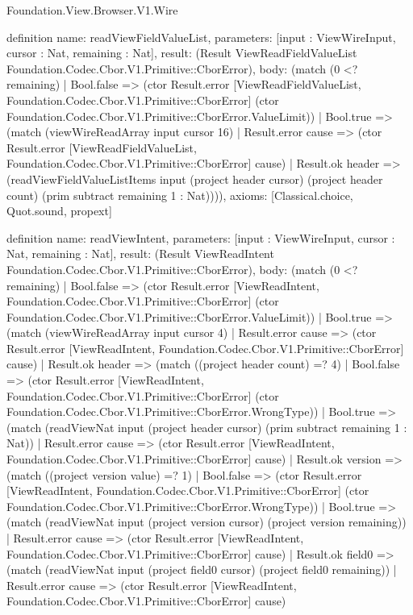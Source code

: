 \begin{lexlean}{Foundation.View.Browser.V1.Wire}
\begin{semanticmodule}
definition{
  name: readViewFieldValueList,
  parameters: [input : ViewWireInput, cursor : Nat, remaining : Nat],
  result: (Result ViewReadFieldValueList Foundation.Codec.Cbor.V1.Primitive::CborError),
  body: (match (0 <? remaining)
    | Bool.false => (ctor Result.error [ViewReadFieldValueList, Foundation.Codec.Cbor.V1.Primitive::CborError] (ctor Foundation.Codec.Cbor.V1.Primitive::CborError.ValueLimit))
    | Bool.true => (match (viewWireReadArray input cursor 16)
      | Result.error cause => (ctor Result.error [ViewReadFieldValueList, Foundation.Codec.Cbor.V1.Primitive::CborError] cause)
      | Result.ok header => (readViewFieldValueListItems input (project header cursor) (project header count) (prim subtract remaining 1 : Nat)))),
  axioms: [Classical.choice, Quot.sound, propext]
}

definition{
  name: readViewIntent,
  parameters: [input : ViewWireInput, cursor : Nat, remaining : Nat],
  result: (Result ViewReadIntent Foundation.Codec.Cbor.V1.Primitive::CborError),
  body: (match (0 <? remaining)
    | Bool.false => (ctor Result.error [ViewReadIntent, Foundation.Codec.Cbor.V1.Primitive::CborError] (ctor Foundation.Codec.Cbor.V1.Primitive::CborError.ValueLimit))
    | Bool.true => (match (viewWireReadArray input cursor 4)
      | Result.error cause => (ctor Result.error [ViewReadIntent, Foundation.Codec.Cbor.V1.Primitive::CborError] cause)
      | Result.ok header => (match ((project header count) =? 4)
        | Bool.false => (ctor Result.error [ViewReadIntent, Foundation.Codec.Cbor.V1.Primitive::CborError] (ctor Foundation.Codec.Cbor.V1.Primitive::CborError.WrongType))
        | Bool.true => (match (readViewNat input (project header cursor) (prim subtract remaining 1 : Nat))
          | Result.error cause => (ctor Result.error [ViewReadIntent, Foundation.Codec.Cbor.V1.Primitive::CborError] cause)
          | Result.ok version => (match ((project version value) =? 1)
            | Bool.false => (ctor Result.error [ViewReadIntent, Foundation.Codec.Cbor.V1.Primitive::CborError] (ctor Foundation.Codec.Cbor.V1.Primitive::CborError.WrongType))
            | Bool.true => (match (readViewNat input (project version cursor) (project version remaining))
              | Result.error cause => (ctor Result.error [ViewReadIntent, Foundation.Codec.Cbor.V1.Primitive::CborError] cause)
              | Result.ok field0 => (match (readViewNat input (project field0 cursor) (project field0 remaining))
                | Result.error cause => (ctor Result.error [ViewReadIntent, Foundation.Codec.Cbor.V1.Primitive::CborError] cause)
}
\end{semanticmodule}
\end{lexlean}
